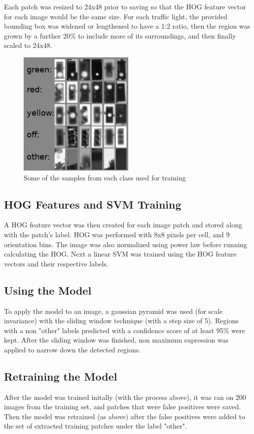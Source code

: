 \documentclass[a4paper]{article}
\begin{document}
Each patch was resized to 24x48 prior to saving so that the HOG feature vector for each image would be the same size.  For each traffic light, the provided bounding box was widened or lengthened to have a 1:2 ratio, then the region was grown by a further 20\% to include more of its surroundings, and then finally scaled to 24x48.

\begin{figure}[!htb]
\centering
\includegraphics[width=0.5\textwidth]{trainingPatches.jpg}
    \caption{\label{fig:masks} Some of the samples from each class used for training}
\end{figure}

\subsection{HOG Features and SVM Training}
A HOG feature vector was then created for each image patch and stored along with the patch's label.  HOG was performed with 8x8 pixels per cell, and 9 orientation bins.  The image was also normalized using power law before running calculating the HOG.  Next a linear SVM was trained using the HOG feature vectors and their respective labels.

\subsection{Using the Model}
To apply the model to an image, a gaussian pyramid was used (for scale invariance) with the sliding window technique (with a step size of 5).  Regions with a non "other" labels predicted with a confidence score of at least 95\% were kept.  After the sliding window was finished, non maximum supression was applied to narrow down the detected regions.

\subsection{Retraining the Model}
After the model was trained initally (with the process above), it was ran on 200 images from the training set, and patches that were false positives were saved.  Then the model was retrained (as above) after the false positives were added to the set of extracted training patches under the label "other".
\end{document}
